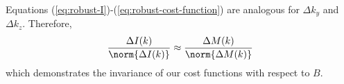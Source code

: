 Equations (\ref{eq:robust-I})-(\ref{eq:robust-cost-function}) are analogous for $\Delta k_y$ and  $\Delta k_z$. Therefore,
\begin{equation}\label{eq:robust-image}
        \frac{\Delta I(k)}{\norm{\Delta I(k)}} \approx \frac{\Delta M(k)}{\norm{\Delta M(k)}}
\end{equation}
which demonstrates the invariance of our cost functions with respect to $B$.